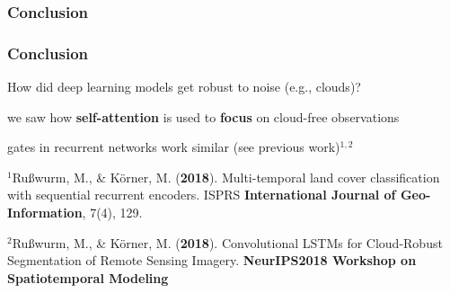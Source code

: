 \documentclass[%
  aspectratio=169,
  9pt,
  USenglish,
  light,
  mathserif,
  professionalfont,
  affiliationintitlepagehead,
  titlegraphic,
   affiliation,
]{beamer}
\begin{document}
{\begin{frame}
\end{frame}
\frametitle{Conclusion}

\begin{frame}
	\frametitle{Conclusion}
	\Large
	
	\begin{leftbubbles}
		How did deep learning models get robust to noise {\small (e.g., clouds)}?
	\end{leftbubbles}
	
	\pause
	\begin{rightbubbles}
		we saw how \textbf{self-attention} is used to \textbf{focus} on cloud-free observations
	\end{rightbubbles}
	
	\pause
	\begin{rightbubbles}
		{gates} in {recurrent networks} work similar {\small (see previous work)$^{1,2}$}
	\end{rightbubbles}
	
\vspace{1em}
	
{\small $^1$Rußwurm, M., \& Körner, M. (\textbf{2018}). Multi-temporal land cover classification with sequential recurrent encoders. ISPRS \textbf{International Journal of Geo-Information}, 7(4), 129.\par}
\vspace{.5em}
{\small $^2$Rußwurm, M., \& Körner, M. (\textbf{2018}). Convolutional LSTMs for Cloud-Robust Segmentation of Remote Sensing Imagery. \textbf{NeurIPS2018 Workshop on Spatiotemporal Modeling}\par}

\end{frame}

%
%
%
%
%
%


}	
\end{document}
